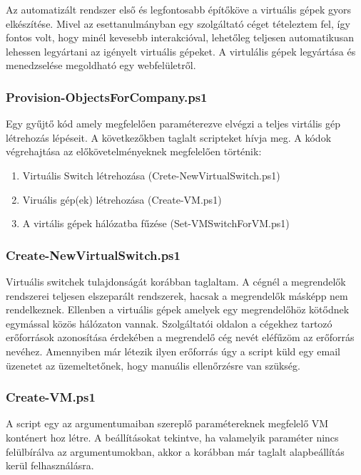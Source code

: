 \documentclass[12pt,oneside,justify,table]{book}
\begin{document}
Az automatizált rendszer első és legfontosabb építőköve a virtuális gépek gyors elkészítése. Mivel az esettanulmányban egy szolgáltató céget tételeztem fel, így fontos volt, hogy minél kevesebb interakcióval, lehetőleg teljesen automatikusan lehessen legyártani az igényelt virtuális gépeket. A virtulális gépek legyártása és menedzselése megoldható egy webfelületről.

\subsubsection{Provision-ObjectsForCompany.ps1}
Egy gyűjtő kód amely megfelelően paraméterezve elvégzi a teljes virtális gép létrehozás lépéseit. 
A következőkben taglalt scripteket hívja meg. 
A kódok végrehajtása az előkövetelményeknek megfelelően történik:
\begin{enumerate}
	\item Virtuális Switch létrehozása (Crete-NewVirtualSwitch.ps1)
	\item Viruális gép(ek) létrehozása (Create-VM.ps1)
	\item A virtális gépek hálózatba fűzése (Set-VMSwitchForVM.ps1)
\end{enumerate}


\subsubsection{Create-NewVirtualSwitch.ps1}

Virtuális switchek tulajdonságát korábban taglaltam. A cégnél a megrendelők rendszerei teljesen elszeparált rendszerek, hacsak a megrendelők másképp nem rendelkeznek. Ellenben a virtuális gépek amelyek egy megrendelőhöz kötődnek egymással közös hálózaton vannak. Szolgáltatói oldalon a cégekhez tartozó erőforrások azonosítása érdekében a megrendelő cég nevét eléfűzöm az erőforrás nevéhez. Amennyiben már létezik ilyen erőforrás úgy a script küld egy email üzenetet az üzemeltetőnek, hogy manuális ellenőrzésre van szükség.

\subsubsection{Create-VM.ps1}

A script egy az argumentumaiban szereplő paramétereknek megfelelő VM konténert hoz létre. A beállításokat tekintve, ha valamelyik paraméter nincs felülbírálva az argumentumokban, akkor a korábban már taglalt alapbeállítás kerül felhasználásra.
\end{document}
